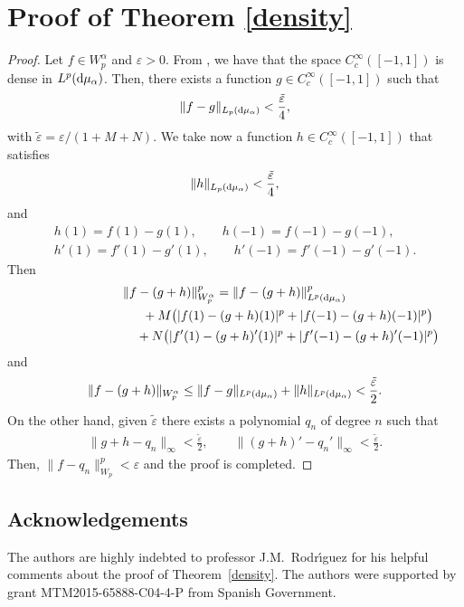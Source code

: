 \documentclass[pdftex]{sigma}
\numberwithin{equation}{section}
\begin{document}
\section{Proof of Theorem \ref{density}}\label{section4}
\begin{proof}
	Let $f\in W_p^{\alpha}$ and $\varepsilon>0$. From \cite[Theorem~4.1]{rodriguez}, we have that the space $C_c^{\infty}([-1,1])$ is dense in $L^p({\rm d}\mu_{\alpha})$. Then, there exists a function $g\in C_c^{\infty}([-1,1])$ such that
\begin{gather*}
	\|f-g\|_{L_p({\rm d}\mu_{\alpha})}<\frac{\tilde{\varepsilon}}{4},
\end{gather*}
with $\tilde{\varepsilon}=\varepsilon/(1+M+N)$. We take now a function $h\in C_c^{\infty}([-1,1])$ that satisfies
\begin{gather*}
	\|h\|_{L_p({\rm d}\mu_{\alpha})}<\frac{\tilde{\varepsilon}}{4},
\end{gather*}
and
\begin{gather*}
	h(1)=f(1)-g(1),\qquad h(-1)=f(-1)-g(-1),
\\
	h'(1)=f'(1)-g'(1),\qquad h'(-1)=f'(-1)-g'(-1).
\end{gather*}
Then
\begin{gather*}
\|f-(g+h)\|^p_{W_p^{\alpha}} =\|f-(g+h)\|^p_{L^p({\rm d}\mu_{\alpha})}\\
\hphantom{\|f-(g+h)\|^p_{W_p^{\alpha}} =}{}
 +M\big(|f(1)-(g+h)(1)|^p+|f(-1)-(g+h)(-1)|^p\big)\\
\hphantom{\|f-(g+h)\|^p_{W_p^{\alpha}} =}{} +N\big(|f'(1)-(g+h)'(1)|^p+|f'(-1)-(g+h)'(-1)|^p\big)
\end{gather*}
and
\begin{gather*}
\|f-(g+h)\|_{W_p^{\alpha}}\le \|f-g\|_{L^p({\rm d}\mu_{\alpha})}+\|h\|_{L^p({\rm d}\mu_{\alpha})}< \frac{\tilde{\varepsilon}}{2}.
\end{gather*}
On the other hand, given $\tilde{\varepsilon}$ there exists a polynomial $q_n$ of degree $n$ such that
\begin{gather*}
	\|g+h-q_n\|_{\infty}<\frac{\tilde{\varepsilon}}{2},\qquad \|(g+h)'-q_n'\|_{\infty}<\frac{\tilde{\varepsilon}}{2}.
\end{gather*}
Then, $\|f-q_n\|_{W_p}^p <\varepsilon$ and the proof is completed.
\end{proof}

\subsection*{Acknowledgements} The authors are highly indebted to professor J.M.~Rodr\'{\i}guez for his helpful comments about the proof of Theorem~\ref{density}. The authors were supported by grant MTM2015-65888-C04-4-P from Spanish Government.
\end{document}
